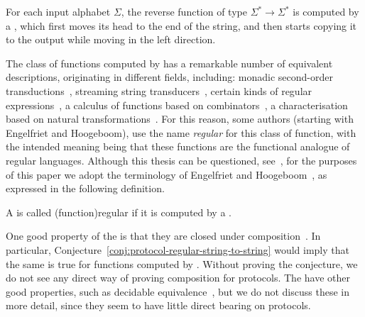     \begin{myexample}[Reverse]
        For each input alphabet $\Sigma$, the reverse function of type
        $\Sigma^* \to \Sigma^*$ is computed by a , which
        first moves its head to the end of the string, and then starts copying
        it to the output while moving in the left direction.
    \end{myexample}

    The class of functions computed by  has a remarkable number
    of equivalent descriptions, originating in different fields, including:
    monadic second-order transductions~\cite[Section
    4]{engelfrietMSODefinableString2001}, streaming string
    transducers~\cite[Section 3]{alurExpressivenessStreamingString2010},
    certain kinds of regular expressions~\cite[Section 2]{alur2014regular}, a
    calculus of functions based on  combinators~\cite[Theorem
    6.1]{bojanczykRegularFirstOrderList2018}, a characterisation based on
    natural transformations~\cite[Theorem 3.2]{bojanczykTitoRegular23}. For
    this reason, some authors (starting with Engelfriet and Hoogeboom), use the
    name \emph{regular} for this class of function, with the intended meaning
    being that these functions are the functional analogue of regular
    languages. Although this thesis can be questioned,
    see~\cite{polyregular-survey}, for the purposes of this paper we adopt the
    terminology of Engelfriet and
    Hoogeboom~\cite[p.~217]{engelfrietMSODefinableString2001}, as expressed in
    the following definition.


    \begin{definition}
        \label{def:regular-string-to-string}
        A  is called \intro(function){regular}
        if it is computed by a .
    \end{definition}
    
    
    One good  property of the  is that
    they are closed under composition~\cite[Theorem
    2]{chytilSerialComposition2Way1977}. In particular,
    Conjecture~\ref{conj:protocol-regular-string-to-string} would imply that
    the same is true for functions computed by . Without proving
    the conjecture, we do not see any direct way of proving composition for
    protocols. The   have other good
    properties, such as decidable equivalence~\cite[Theorem
    1]{gurariEquivalenceProblemDeterministic1982}, but we do not discuss these
    in more detail, since they seem to have little direct bearing on protocols.


